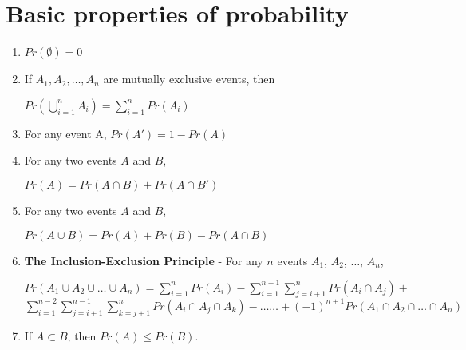 \documentclass[a4paper]{article}
\begin{document}
\section{Basic properties of probability}
\begin{enumerate}
	\item $Pr(\emptyset) = 0$
	\item If $A_1, A_2,\dots,A_n$ are mutually exclusive events, then
	\begin{center}
		$Pr(\bigcup\limits_{i=1}^{n}A_i)=\sum_{i=1}^{n}Pr(A_i)$
	\end{center}
	\item For any event A, $Pr(A') = 1 - Pr(A)$
	\item For any two events $A$ and $B$, 
	\begin{center}
		$Pr(A) = Pr(A\cap B) + Pr(A \cap B')$
	\end{center}
	\item For any two events $A$ and $B$,
	\begin{center}
		$Pr(A \cup B) = Pr(A) + Pr(B) - Pr(A\cap B)$
	\end{center}
	\item \textbf{The Inclusion-Exclusion Principle} - For any $n$ events $A_1$, $A_2$, $\dots$, $A_n$,
	\begin{center}
		$Pr(A_1\cup A_2\cup \dots \cup A_n) = \sum\limits_{i=1}^{n}Pr(A_i) - \sum_{i=1}^{n-1}\sum\limits_{j=i+1}^{n}Pr(A_i\cap A_j) +$\\$\sum\limits_{i=1}^{n-2}\sum\limits_{j=i+1}^{n-1}\sum\limits_{k=j+1}^{n}Pr(A_i\cap A_j\cap A_k) - \dots \dots +(-1)^{n+1}Pr(A_1\cap A_2\cap \dots \cap A_n)$
	\end{center}
	\item If $A \subset B$, then $Pr(A) \le Pr(B)$.
\end{enumerate}
\end{document}
